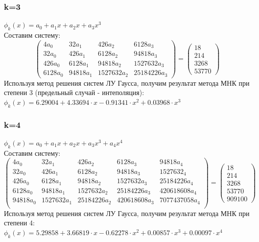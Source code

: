 \documentclass{article}
\begin{document}
\subsubsection{k=3}
$\phi_k(x) = a_0 + a_1x + a_2x + a_3x^3$\\
Составим систему:
\begin{displaymath}
\left(
  \begin{array}{cccc}
    4 a_{0} & 32 a_{1} & 426 a_{2} & 6128 a_{3}\\
    32 a_{0} & 426 a_{1} & 6128 a_{2} & 94818 a_{3}\\
    426 a_{0} & 6128 a_{1} & 94818 a_{2} & 1527632 a_{3} \\
    6128 a_{0} & 94818 a_{1} & 1527632 a_{2} & 25184226 a_{3} 
  \end{array}
\right)
=
\left(
  \begin{array}{ccc}
    18\\
    214\\
    3268\\
    53770
  \end{array}
\right)
\end{displaymath}
Используя метод решения систем ЛУ Гаусса, получим результат метода МНК при
степени 3 (предельный случай - интеполяция):\\
$ \phi_k(x) = 
  6.29004 +
  4.33694 \cdot x -
  0.91341 \cdot x^2 +
  0.03968 \cdot x^3
$
\subsubsection{k=4}
$\phi_k(x) = a_0 + a_1x + a_2x + a_3x^3 + a_4x^4$\\
Составим систему:
\begin{displaymath}
\left(
  \begin{array}{ccccc}
    4 a_{0} & 32 a_{1} & 426 a_{2} & 6128 a_{3} & 94818 a_{4}\\
    32 a_{0} & 426 a_{1} & 6128 a_{2} & 94818 a_{3} & 1527632_{4}\\
    426 a_{0} & 6128 a_{1} & 94818 a_{2} & 1527632 a_{3} & 25184226 a_{4}\\
    6128 a_{0} & 94818 a_{1} & 1527632 a_{2} & 25184226 a_{3} & 420618608 a_{4}\\
    94818 a_{0} & 1527632 a_{1} & 25184226 a_{2} & 420618608 a_{3} & 7077437058 a_{4}\\
  \end{array}
\right)
=
\left(
  \begin{array}{ccc}
    18\\
    214\\
    3268\\
    53770\\
    909100
  \end{array}
\right)
\end{displaymath}
Используя метод решения систем ЛУ Гаусса, получим результат метода МНК при
степени 4: \\
$ \phi_k(x) =
  5.29858 +
  3.66819 \cdot x -
  0.62278 \cdot x^2 + 
  0.00857 \cdot x^3 + 
  0.00097 \cdot x^4
$
\end{document}
